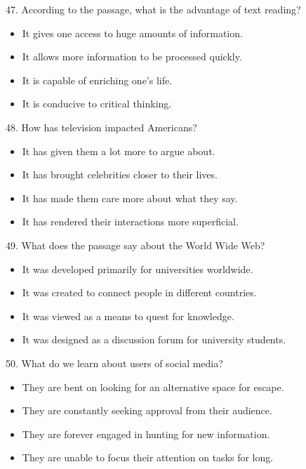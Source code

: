 \documentclass[UTF8,11pt]{ctexart}
\begin{document}
47. According to the passage, what is the advantage of text reading?


\begin{itemize}[leftmargin=2em,itemsep=.2em,topsep=.4em]\item[A.] It gives one access to huge amounts of information.
\item[B.] It allows more information to be processed quickly.
\item[C.] It is capable of enriching one's life.
\item[D.] It is conducive to critical thinking.
\end{itemize}

48. How has television impacted Americans?


\begin{itemize}[leftmargin=2em,itemsep=.2em,topsep=.4em]\item[A.] It has given them a lot more to argue about.
\item[B.] It has brought celebrities closer to their lives.
\item[C.] It has made them care more about what they say.
\item[D.] It has rendered their interactions more superficial.
\end{itemize}

49. What does the passage say about the World Wide Web?


\begin{itemize}[leftmargin=2em,itemsep=.2em,topsep=.4em]\item[A.] It was developed primarily for universities worldwide.
\item[B.] It was created to connect people in different countries.
\item[C.] It was viewed as a means to quest for knowledge.
\item[D.] It was designed as a discussion forum for university students.
\end{itemize}

50. What do we learn about users of social media?


\begin{itemize}[leftmargin=2em,itemsep=.2em,topsep=.4em]\item[A.] They are bent on looking for an alternative space for escape.
\item[B.] They are constantly seeking approval from their audience.
\item[C.] They are forever engaged in hunting for new information.
\item[D.] They are unable to focus their attention on tasks for long.
\end{itemize}
\end{document}
